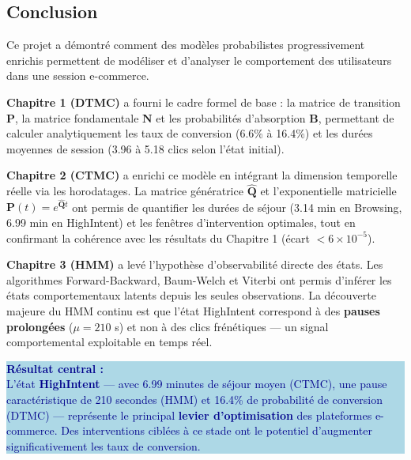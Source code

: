 \documentclass[11pt,a4paper]{article}
\newcommand{\mat}[1]{\mathbf{#1}}
\begin{document}
\subsection{Conclusion}

Ce projet a démontré comment des modèles probabilistes progressivement enrichis
permettent de modéliser et d'analyser le comportement des utilisateurs dans une session e-commerce.

\textbf{Chapitre 1 (DTMC)} a fourni le cadre formel de base : la matrice de transition $\mat{P}$,
la matrice fondamentale $\mat{N}$ et les probabilités d'absorption $\mat{B}$, permettant de
calculer analytiquement les taux de conversion (6.6\% à 16.4\%) et les durées moyennes
de session (3.96 à 5.18 clics selon l'état initial).

\textbf{Chapitre 2 (CTMC)} a enrichi ce modèle en intégrant la dimension temporelle réelle
via les horodatages. La matrice génératrice $\hat{\mat{Q}}$ et l'exponentielle matricielle
$\mat{P}(t) = e^{\hat{\mat{Q}}t}$ ont permis de quantifier les durées de séjour (3.14 min en
Browsing, 6.99 min en HighIntent) et les fenêtres d'intervention optimales, tout en confirmant
la cohérence avec les résultats du Chapitre 1 (écart $< 6 \times 10^{-5}$).

\textbf{Chapitre 3 (HMM)} a levé l'hypothèse d'observabilité directe des états.
Les algorithmes Forward-Backward, Baum-Welch et Viterbi ont permis d'inférer les états
comportementaux latents depuis les seules observations. La découverte majeure du HMM continu
est que l'état HighIntent correspond à des \textbf{pauses prolongées} ($\mu = 210$ s) et non
à des clics frénétiques --- un signal comportemental exploitable en temps réel.

\vspace{0.5cm}

\begin{center}
\colorbox{LightBlue}{\parbox{0.92\textwidth}{
\vspace{0.4cm}
\centering
\textcolor{DarkBlue}{\Large\textbf{Résultat central :}} \\[0.3cm]
\textcolor{DarkBlue}{
L'état \textbf{HighIntent} --- avec 6.99 minutes de séjour moyen (CTMC),
une pause caractéristique de 210 secondes (HMM) et 16.4\% de probabilité de conversion (DTMC)
--- représente le principal \textbf{levier d'optimisation} des plateformes e-commerce.
Des interventions ciblées à ce stade ont le potentiel d'augmenter significativement
les taux de conversion.
}
\vspace{0.4cm}
}}
\end{center}
\end{document}

